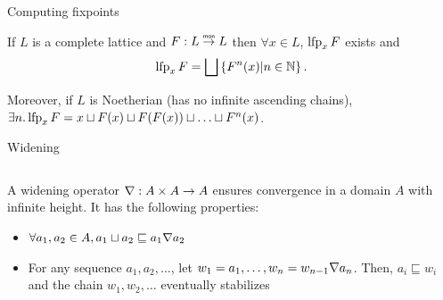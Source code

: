 \documentclass[aspectratio=169]{beamer}
\begin{document}
\begin{frame}{Computing fixpoints}
  \begin{thm}
    If $L$ is a complete lattice and $F: L \monarrow L$ then $\forall x \in L$, $\operatorname{lfp}_x F$ exists and
    \[
      \operatorname{lfp}_x F = \bigsqcup \left\{F^n(x) \vert n \in \mathbb{N}\right\}.
    \]
  \end{thm}

  Moreover, if $L$ is Noetherian (has no infinite ascending chains), $\exists n. \operatorname{lfp}_x F = x \sqcup F(x) \sqcup F(F(x)) \sqcup \ldots \sqcup F^n(x)$.
\end{frame}

\begin{frame}{Widening}
  \small
  \begin{columns}
    \begin{column}{0.75\textwidth}
  A widening operator $\nabla : A \times A \to A$ ensures convergence
  in a domain $A$ with infinite height. It has the following
  properties:\vspace{-0.3em}
  \begin{itemize}\footnotesize
  \item<2-> $\forall a_1, a_2 \in A, a_1 \sqcup a_2 \sqsubseteq a_1 \nabla a_2$
  \item<2-> For any sequence $a_1, a_2, \ldots$, let $w_1 = a_1, \ldots, w_n = w_{n-1} \nabla a_n$. Then, $a_i \sqsubseteq w_i$ and the chain $w_1, w_2, \ldots$ eventually stabilizes
  \end{itemize}\vspace{-0.3em}
\end{column}
\begin{column}{0.2\textwidth}\tiny
\end{column}
\end{columns}
\end{frame}
\end{document}
